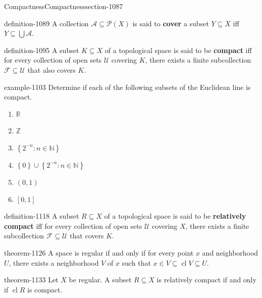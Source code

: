 \documentclass[oneside,10pt,]{article}
\newcommand{\terminology}[1]{\textbf{#1}}
\newcommand{\mb}{\mathbb}
\newcommand{\mc}{\mathcal}
\newcommand{\cl}{\operatorname{cl}}
\newcommand{\setBuilder}[2]{\left\{#1:#2\right\}}
\newcommand{\setList}[1]{\left\{#1\right\}}
\begin{document}
\begin{sectionptx}{Compactness}{}{Compactness}{}{}{section-1087}
\begin{definition}{}{definition-1089}%
\hypertarget{p-1090}{}%
A collection \(\mc A\subseteq \mc P(X)\) is said to \terminology{cover} a subset \(Y\subseteq X\) iff \(Y\subseteq\bigcup\mc A\).%
\end{definition}
\begin{definition}{}{definition-1095}%
\hypertarget{p-1096}{}%
A subset \(K\subseteq X\) of a topological space is said to be \terminology{compact} iff for every collection of open sets \(\mc U\) covering \(K\), there exists a finite subcollection \(\mc F\subseteq\mc U\) that also covers \(K\).%
\end{definition}
\begin{example}{}{example-1103}%
\hypertarget{p-1104}{}%
Determine if each of the following subsets of the Euclidean line is compact.%
\leavevmode%
\begin{enumerate}
\item\hypertarget{li-1106}{}\(\mb R\)%
\item\hypertarget{li-1108}{}\(\mb Z\)%
\item\hypertarget{li-1110}{}\(\setBuilder{2^{-n}}{n\in\mb N}\)%
\item\hypertarget{li-1112}{}\(\setList{0}\cup\setBuilder{2^{-n}}{n\in\mb N}\)%
\item\hypertarget{li-1114}{}\((0,1)\)%
\item\hypertarget{li-1116}{}\([0,1]\)%
\end{enumerate}
\end{example}
\begin{definition}{}{definition-1118}%
\hypertarget{p-1119}{}%
A subset \(R\subseteq X\) of a topological space is said to be \terminology{relatively compact} iff for every collection of open sets \(\mc U\) covering \(X\), there exists a finite subcollection \(\mc F\subseteq\mc U\) that covers \(K\).%
\end{definition}
\begin{theorem}{}{}{theorem-1126}%
\hypertarget{p-1127}{}%
A space is regular if and only if for every point \(x\) and neighborhood \(U\), there exists a neighborhood \(V\) of \(x\) such that \(x\in V\subseteq\cl V\subseteq U\).%
\end{theorem}
\begin{theorem}{}{}{theorem-1133}%
\hypertarget{p-1134}{}%
Let \(X\) be regular. A subset \(R\subseteq X\) is relatively compact if and only if \(\cl R\) is compact.%

\end{theorem}
\end{sectionptx}
\end{document}
